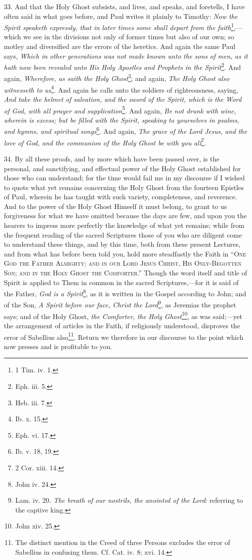 33. And that the Holy Ghost subsists, and lives, and speaks, and foretells, I have often said in what goes before, and Paul writes it plainly to Timothy: \emph{Now the Spirit speaketh expressly, that in later times some shall depart from the faith}\footnote{1 Tim. iv. 1.},—which we see in the divisions not only of former times but also of our own; so motley and diversified are the errors of the heretics. And again the same Paul says, \emph{Which in other generations was not made known unto the sons of men, as it hath now been revealed unto His Holy Apostles and Prophets in the Spirit}\footnote{Eph. iii. 5.}. And again, \emph{Wherefore, as saith the Holy Ghost}\footnote{Heb. iii. 7.}; and again, \emph{The Holy Ghost also witnesseth to us}\footnote{Ib. x. 15.}. And again he calls unto the soldiers of righteousness, saying, \emph{And take the helmet of salvation, and the sword of the Spirit, which is the Word of God, with all prayer and supplication}\footnote{Eph. vi. 17.}. And again, \emph{Be not drunk with wine, wherein is excess; but be filled with the Spirit, speaking to yourselves in psalms, and hymns, and spiritual songs}\footnote{Ib. v. 18, 19.}. And again, \emph{The grace of the Lord Jesus, and the love of God, and the communion of the Holy Ghost be with you all}\footnote{2 Cor. xiii. 14.}.

34. By all these proofs, and by more which have been passed over, is the personal, and sanctifying, and effectual power of the Holy Ghost established for those who can understand; for the time would fail me in my discourse if I wished to quote what yet remains concerning the Holy Ghost from the fourteen Epistles of Paul, wherein he has taught with such variety, completeness, and reverence. And to the power of the Holy Ghost Himself it must belong, to grant to us forgiveness for what we have omitted because the days are few, and upon you the hearers to impress more perfectly the knowledge of what yet remains; while from the frequent reading of the sacred Scriptures those of you who are diligent come to understand these things, and by this time, both from these present Lectures, and from what has before been told you, hold more steadfastly the Faith in “\textsc{One God the Father Almighty; and in our Lord Jesus Christ, His Only-Begotten Son; and in the Holy Ghost the Comforter}.” Though the word itself and title of Spirit is applied to Them in common in the sacred Scriptures,—for it is said of the Father, \emph{God is a Spirit}\footnote{John iv. 24.}, as it is written in the Gospel according to John; and of the Son, \emph{A Spirit before our face, Christ the Lord}\footnote{Lam. iv. 20. \emph{The breath of our nostrils, the anointed of the Lord}: referring to the captive king.}, as Jeremias the prophet says; and of the Holy Ghost, \emph{the Comforter, the Holy Ghost}\footnote{John xiv. 25.}, as was said;—yet the arrangement of articles in the Faith, if religiously understood, disproves the error of Sabellius also\footnote{The distinct mention in the Creed of three Persons excludes the error of Sabellius in confusing them. Cf. Cat. iv. 8; xvi. 14.}. Return we therefore in our discourse to the point which now presses and is profitable to you.

